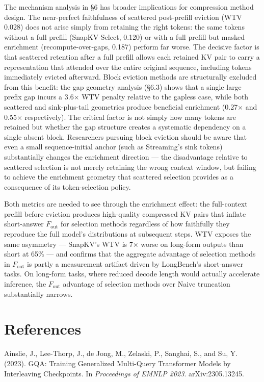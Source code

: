 \documentclass[10pt,letterpaper]{article}
\begin{document}
The mechanism analysis in §6 has broader implications for compression
method design. The near-perfect faithfulness of scattered post-prefill
eviction (WTV 0.028) does not arise simply from retaining the right
tokens: the same tokens without a full prefill (SnapKV-Select, 0.120)
or with a full prefill but masked enrichment (recompute-over-gaps,
0.187) perform far worse. The decisive factor is that scattered
retention after a full prefill allows each retained KV pair to carry a
representation that attended over the entire original sequence,
including tokens immediately evicted afterward. Block eviction methods
are structurally excluded from this benefit: the gap geometry analysis (§6.3) shows that a single large prefix gap
incurs a 3.6× WTV penalty relative to the gapless case, while both
scattered and sink-plus-tail geometries produce beneficial enrichment
(0.27× and 0.55× respectively). The critical factor is not simply how
many tokens are retained but whether the gap structure creates a
systematic dependency on a single absent block. Researchers pursuing
block eviction should be aware that even a small sequence-initial
anchor (such as Streaming's sink tokens) substantially changes the
enrichment direction --- the disadvantage relative to scattered
selection is not merely retaining the wrong context window, but failing
to achieve the enrichment geometry that scattered selection provides as
a consequence of its token-selection policy.

Both metrics are needed to see through the enrichment effect: the full-context
prefill before eviction produces high-quality compressed KV pairs that inflate
short-answer \(F_{\text{out}}\) for selection methods regardless of how faithfully
they reproduce the full model's distributions at subsequent steps. WTV exposes
the same asymmetry --- SnapKV's WTV is 7× worse on long-form outputs than short
at 65\% --- and confirms that the aggregate advantage of selection methods in
\(F_{\text{out}}\) is partly a measurement artifact driven by LongBench's
short-answer tasks.
On long-form tasks, where reduced decode length would actually accelerate
inference, the \(F_{\text{out}}\) advantage of selection methods over Naive
truncation substantially narrows.

\hypertarget{references}{%
\section{References}\label{references}}

Ainslie, J., Lee-Thorp, J., de Jong, M., Zelaski, P., Sanghai, S., and
Su, Y. (2023). GQA: Training Generalized Multi-Query Transformer Models
by Interleaving Checkpoints. In \emph{Proceedings of EMNLP 2023}.
arXiv:2305.13245.
\end{document}
